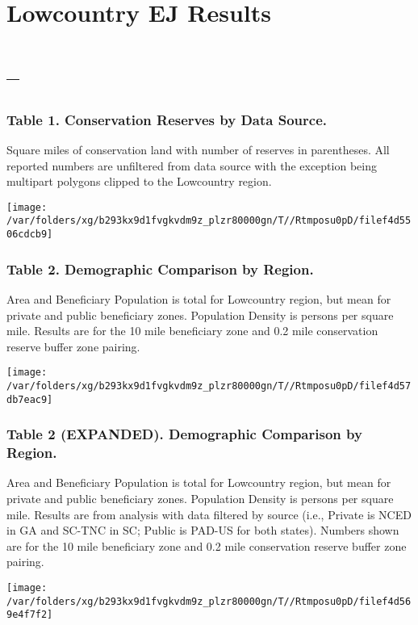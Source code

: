 \documentclass[landscape]{article}
\author{}
\date{\vspace{-2.5em}}
\begin{document}
\hypertarget{lowcountry-ej-results}{%
\section{Lowcountry EJ Results}\label{lowcountry-ej-results}}

\hypertarget{section}{%
\section{--}\label{section}}

\hypertarget{table-1.-conservation-reserves-by-data-source.}{%
\subsubsection{Table 1. Conservation Reserves by Data
Source.}\label{table-1.-conservation-reserves-by-data-source.}}

Square miles of conservation land with number of reserves in
parentheses. All reported numbers are unfiltered from data source with
the exception being multipart polygons clipped to the Lowcountry region.

\texttt{[image: /var/folders/xg/b293kx9d1fvgkvdm9z\_plzr80000gn/T//Rtmposu0pD/filef4d5506cdcb9]}

\hypertarget{table-2.-demographic-comparison-by-region.}{%
\subsubsection{Table 2. Demographic Comparison by
Region.}\label{table-2.-demographic-comparison-by-region.}}

Area and Beneficiary Population is total for Lowcountry region, but mean
for private and public beneficiary zones. Population Density is persons
per square mile. Results are for the 10 mile beneficiary zone and 0.2
mile conservation reserve buffer zone pairing.

\texttt{[image: /var/folders/xg/b293kx9d1fvgkvdm9z\_plzr80000gn/T//Rtmposu0pD/filef4d57db7eac9]}
\pagebreak

\hypertarget{table-2-expanded.-demographic-comparison-by-region.}{%
\subsubsection{Table 2 (EXPANDED). Demographic Comparison by
Region.}\label{table-2-expanded.-demographic-comparison-by-region.}}

Area and Beneficiary Population is total for Lowcountry region, but mean
for private and public beneficiary zones. Population Density is persons
per square mile. Results are from analysis with data filtered by source
(i.e., Private is NCED in GA and SC-TNC in SC; Public is PAD-US for both
states). Numbers shown are for the 10 mile beneficiary zone and 0.2 mile
conservation reserve buffer zone pairing.

\texttt{[image: /var/folders/xg/b293kx9d1fvgkvdm9z\_plzr80000gn/T//Rtmposu0pD/filef4d569e4f7f2]}
\end{document}
